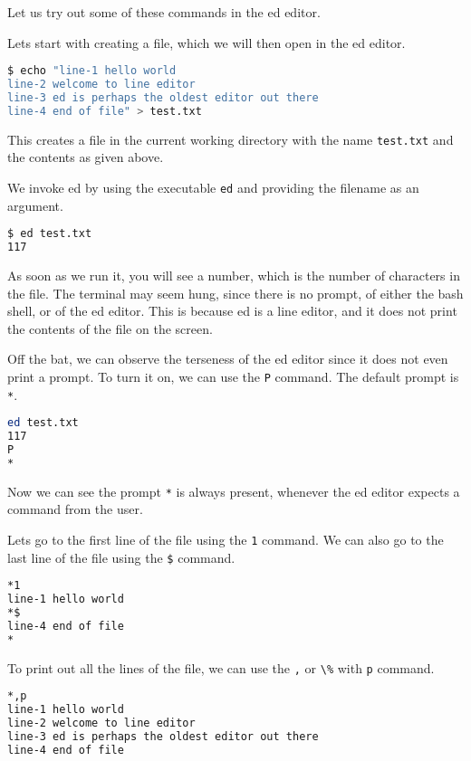 Let us try out some of these commands in the ed editor.

Lets start with creating a file, which we will then open
in the ed editor.

\begin{lstlisting}[language=bash]
$ echo "line-1 hello world
line-2 welcome to line editor
line-3 ed is perhaps the oldest editor out there
line-4 end of file" > test.txt
\end{lstlisting}

This creates a file in the current working directory
with the name \lstinline|test.txt| and the contents as
given above.

We invoke ed by using the executable \lstinline|ed|
and providing the filename as an argument.

\begin{lstlisting}[language=bash]
$ ed test.txt
117
\end{lstlisting}

As soon as we run it, you will see a number,
which is the number of characters in the file.
The terminal may seem hung, since there is no
prompt, of either the bash shell, or of the ed editor.
This is because ed is a line editor, and it does not
print the contents of the file on the screen.

Off the bat, we can observe the terseness of the ed editor
since it does not even print a prompt.
To turn it on, we can use the \lstinline|P| command.
The default prompt is \lstinline|*|.

\begin{lstlisting}[language=bash]
ed test.txt
117
P
*
\end{lstlisting}

Now we can see the prompt \lstinline|*| is always present,
whenever the ed editor expects a command from the user.

Lets go to the first line of the file using the \lstinline|1| command.
We can also go to the last line of the file using the \lstinline|$| command.

\begin{lstlisting}[language=bash]
*1
line-1 hello world
*$
line-4 end of file
*
\end{lstlisting}

To print out all the lines of the file,
we can use the \lstinline|,| or \lstinline|\%| with \lstinline|p| command.

\begin{lstlisting}[language=bash]
*,p
line-1 hello world
line-2 welcome to line editor
line-3 ed is perhaps the oldest editor out there
line-4 end of file
\end{lstlisting}

